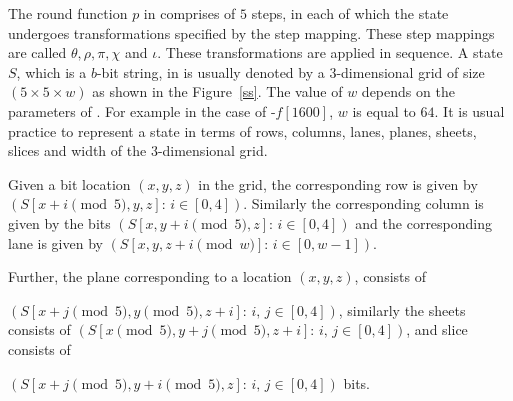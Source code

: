 The round function $p$ in \Keccak{} comprises of $5$ steps, in each of which the state undergoes transformations specified by the step mapping. These step mappings are called $\theta, \rho, \pi, \chi$ and  $\iota$. These transformations are applied in sequence. A state $S$, which is a $b$-bit string, in \Keccak{} is usually denoted by a $3$-dimensional grid of size $(5 \times 5 \times w)$ as shown in the Figure~\ref{ss}. The value of $w$ depends on the parameters of \Keccak{}. For example in the case of \Keccak-$f\left[1600\right]$, $w$ is equal to $64$. It is usual practice to represent a state in terms of rows, columns, lanes, planes, sheets, slices and width of the $3$-dimensional grid.

Given a bit location $(x,y,z)$ in the grid, the corresponding row is given by $\left( S[x+i \pmod 5,y,z] : \, i \in [0,4] \right)$. Similarly the corresponding column is given by the bits $\left( S[x,y+i \pmod 5,z] : \, i \in [0,4] \right)$ and the corresponding lane is given by $\left( S[x,y,z+i \pmod w] : \, i \in [0,w-1] \right)$. 

Further, the plane corresponding to a location $(x,y,z)$, consists of 

$\left( S[x+j \pmod 5,y \pmod 5,z + i] : \, i,\,j \in [0,4] \right)$, similarly the sheets consists of $\left( S[x \pmod 5,y+j \pmod 5,z + i] : \, i,\,j \in [0,4] \right)$, and slice consists of 

$\left( S[x+j \pmod 5,y+i \pmod 5,z] : \, i,\,j \in [0,4] \right)$ bits.

